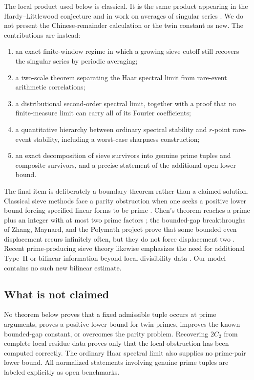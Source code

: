 \documentclass[11pt]{article}
\theoremstyle{definition}
\theoremstyle{remark}
\begin{document}
The local product used below is classical.  It is the same product appearing in the Hardy--Littlewood conjecture and in work on averages of singular series \citep{Gallagher1976,Pintz2010}.  We do not present the Chinese-remainder calculation or the twin constant as new.  The contributions are instead:

\begin{enumerate}[label=\textbf{R\arabic*.},leftmargin=3.2em]
    \item an exact finite-window regime in which a growing sieve cutoff still recovers the singular series by periodic averaging;
    \item a two-scale theorem separating the Haar spectral limit from rare-event arithmetic correlations;
    \item a distributional second-order spectral limit, together with a proof that no finite-measure limit can carry all of its Fourier coefficients;
    \item a quantitative hierarchy between ordinary spectral stability and $r$-point rare-event stability, including a worst-case sharpness construction;
    \item an exact decomposition of sieve survivors into genuine prime tuples and composite survivors, and a precise statement of the additional open lower bound.
\end{enumerate}

The final item is deliberately a boundary theorem rather than a claimed solution.  Classical sieve methods face a parity obstruction when one seeks a positive lower bound forcing specified linear forms to be prime \citep{HeathBrown1982,FriedlanderIwaniec2010}.  Chen's theorem reaches a prime plus an integer with at most two prime factors \citep{Chen1973}; the bounded-gap breakthroughs of Zhang, Maynard, and the Polymath project prove that some bounded even displacement recurs infinitely often, but they do not force displacement two \citep{Zhang2014,Maynard2015,DHJPolymath2014}.  Recent prime-producing sieve theory likewise emphasizes the need for additional Type~II or bilinear information beyond local divisibility data \citep{FordMaynard2024}.  Our model contains no such new bilinear estimate.

\subsection*{What is not claimed}

No theorem below proves that a fixed admissible tuple occurs at prime arguments, proves a positive lower bound for twin primes, improves the known bounded-gap constant, or overcomes the parity problem.  Recovering $2C_2$ from complete local residue data proves only that the local obstruction has been computed correctly.  The ordinary Haar spectral limit also supplies no prime-pair lower bound.  All normalized statements involving genuine prime tuples are labeled explicitly as open benchmarks.
\end{document}
